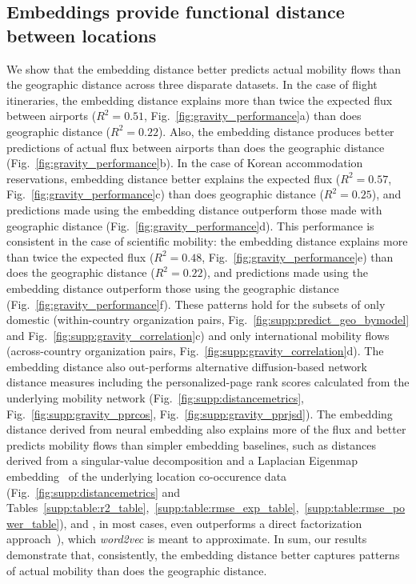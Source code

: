 \documentclass[12pt]{article} %
\begin{document}
%
%
%
\subsection*{Embeddings provide functional distance between locations}

We show that the embedding distance better predicts actual mobility flows than the geographic distance across three disparate datasets.
In the case of flight itineraries, the embedding distance explains more than twice the expected flux between airports ($R^{2} = 0.51$, Fig.~\ref{fig:gravity_performance}a) than does geographic distance ($R^{2} = 0.22$).  Also, the embedding distance produces better predictions of actual flux between airports than does the geographic distance (Fig.~\ref{fig:gravity_performance}b).
In the case of Korean accommodation reservations, embedding distance better explains the expected flux ($R^{2} = 0.57$, Fig.~\ref{fig:gravity_performance}c) than does geographic distance ($R^{2} = 0.25$), and predictions made using the embedding distance outperform those made with geographic distance (Fig.~\ref{fig:gravity_performance}d).
This performance is consistent in the case of scientific mobility:
the embedding distance explains more than twice the expected flux ($R^{2} = 0.48$, Fig.~\ref{fig:gravity_performance}e) than does the geographic distance ($R^{2} = 0.22$), and predictions made using the embedding distance outperform those using the geographic distance (Fig.~\ref{fig:gravity_performance}f).
These patterns hold for the subsets of only domestic (within-country organization pairs, Fig.~\ref{fig:supp:predict_geo_bymodel} and Fig.~\ref{fig:supp:gravity_correlation}c) and only international mobility flows (across-country organization pairs, Fig.~\ref{fig:supp:gravity_correlation}d).
The embedding distance also out-performs alternative diffusion-based network distance measures including the personalized-page rank scores calculated from the underlying mobility network (Fig.~\ref{fig:supp:distancemetrics}, Fig.~\ref{fig:supp:gravity_pprcos}, Fig.~\ref{fig:supp:gravity_pprjsd}).
The embedding distance derived from neural embedding also explains more of the flux and better predicts mobility flows than simpler embedding baselines, such as distances derived from a singular-value decomposition and a Laplacian Eigenmap embedding~\autocite{belkin2003laplacian} of the underlying location co-occurence data (Fig.~\ref{fig:supp:distancemetrics} and Tables~\ref{supp:table:r2_table},~\ref{supp:table:rmse_exp_table},~\ref{supp:table:rmse_power_table}), and , in most cases, even outperforms a direct factorization approach~\autocite{levy2014neural}), which \textit{word2vec} is meant to approximate.
In sum, our results demonstrate that, consistently, the embedding distance better captures patterns of actual mobility than does the geographic distance.
\end{document}
